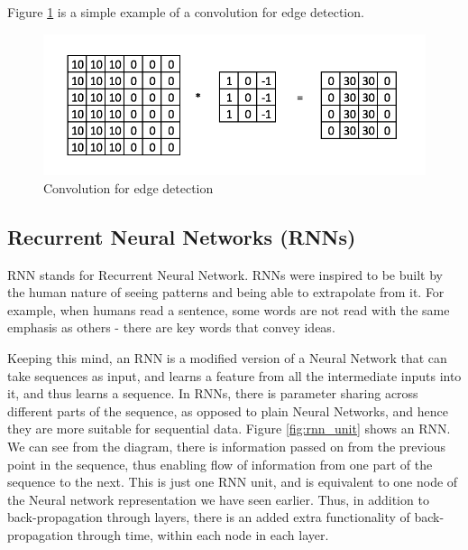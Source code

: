 Figure \ref{fig:convolution_edge_detection} is a simple example of a convolution for edge detection. 


\begin{figure}
    \centering
    \includegraphics[height=0.15\paperheight]{Figures/cnn_edge_detection.png}
    \caption[Convolution for edge detection]{Convolution for edge detection}
    \label{fig:convolution_edge_detection}
\end{figure}
\subsection{Recurrent Neural Networks (RNNs)}

RNN stands for Recurrent Neural Network. 
RNNs were inspired to be built by the human nature of seeing patterns and being able to extrapolate from it. For example, when humans read a sentence, some words are not read with the same emphasis as others - there are key words that convey ideas.

Keeping this mind, an RNN is a modified version of a Neural Network that can take sequences as input, and learns a feature from all the intermediate inputs into it, and thus learns a sequence. In RNNs, there is parameter sharing across different parts of the sequence, as opposed to plain Neural Networks, and hence they are more suitable for sequential data. Figure \ref{fig:rnn_unit} shows an RNN. We can see from the diagram, there is information passed on from the previous point in the sequence, thus enabling flow of information from one part of the sequence to the next. This is just one RNN unit, and is equivalent to one node of the Neural network representation we have seen earlier. Thus, in addition to back-propagation through layers, there is an added extra functionality of back-propagation through time, within each node in each layer.

